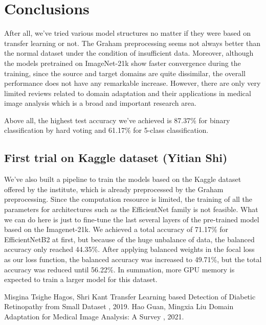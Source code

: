 \documentclass{article}
\begin{document}
\section{Conclusions}
\label{sec:conclusion}
After all, we've tried various model structures no matter if they were based on transfer learning or not. The Graham preprocessing seems not always better than the normal dataset under the condition of insufficient data. Moreover, although the models pretrained on ImageNet-21k show faster convergence during the training, since the source and target domains are quite dissimilar, the overall performance does not have any remarkable increase. However, there are only very limited reviews related to domain adaptation and their applications in medical image analysis which is a broad and important research area\cite{Hao}. 

Above all, the highest test accuracy we've achieved is 87.37\% for binary classification by hard voting and 61.17\% for 5-class classification. 
\subsection{First trial on Kaggle dataset (Yitian Shi)}
We've also built a pipeline to train the models based on the Kaggle dataset offered by the institute, which is already preprocessed by the Graham preprocessing. Since the computation resource is limited, the training of all the parameters for architectures such as the EfficientNet family is not feasible. What we can do here is just to fine-tune the last several layers of the pre-trained model based on the Imagenet-21k. We achieved a total accuracy of 71.17\% for EfficientNetB2 at first, but because of the huge unbalance of data, the balanced accuracy only reached 44.35\%. After applying balanced weights in the focal loss as our loss function, the balanced accuracy was increased to 49.71\%, but the total accuracy was reduced until 56.22\%. In summation, more GPU memory is expected to train a larger model for this dataset. 

  


\begin{thebibliography}{1}



Misgina Tsighe Hagos, Shri Kant
\newblock Transfer Learning based Detection of Diabetic Retinopathy from Small Dataset
, 2019.
Hao Guan, Mingxia Liu
\newblock Domain Adaptation for Medical Image Analysis: A Survey
, 2021.

\end{thebibliography}
\end{document}

